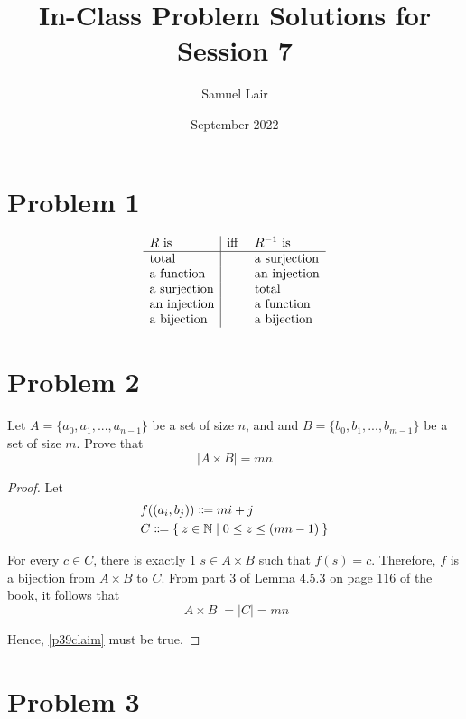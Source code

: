 \documentclass{article}
\title{In-Class Problem Solutions for Session 7}
\author{Samuel Lair}
\date{September 2022}
\begin{document}
\maketitle
\tableofcontents

\pagebreak

\section{Problem 1}
\[
	\begin{array}{l|l l}
		R \text{ is}        & \text{iff } & R^{-1} \text{ is}   \\
		\hline
		\text{total}        &             & \text{a surjection} \\
		\text{a function}   &             & \text{an injection} \\
		\text{a surjection} &             & \text{total}        \\
		\text{an injection} &             & \text{a function}   \\
		\text{a bijection}  &             & \text{a bijection}
	\end{array}
\]

\pagebreak

\section{Problem 2}
Let $A = \{a_0, a_1, ..., a_{n-1}\}$ be a set of size $n$, and and $B = \{b_0,b_1,...,b_{m-1}\}$ be a set of size $m$. Prove that
\begin{equation}\label{p39claim}
	|A \times B| = mn
\end{equation}
\begin{proof}
	Let
	\begin{align*}
		 & f((a_i, b_j)) \Coloneqq mi + j                            \\
		 & C \Coloneqq \Set{z \in \mathbb{N} | 0 \le z \le (mn - 1)}
	\end{align*}

	For every $c \in C$, there is exactly 1 $s \in A \times B$ such that $f(s) = c$. Therefore, $f$ is a bijection from $A \times B$ to $C$. From part 3 of Lemma 4.5.3 on page 116 of the book, it follows that
	\[
		|A \times B| = |C| = mn
	\]

	Hence, \eqref{p39claim} must be true.
\end{proof}

\pagebreak

\section{Problem 3}
\end{document}
